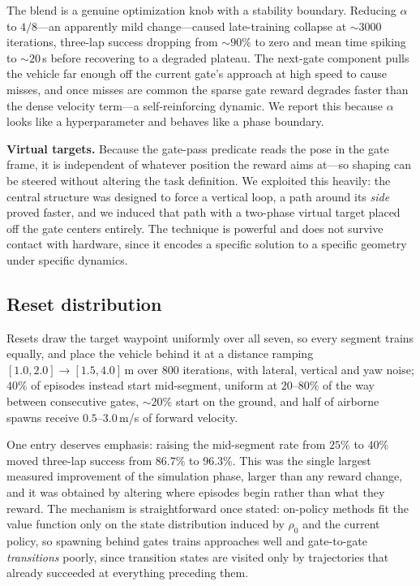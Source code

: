 \documentclass[10pt, twocolumn]{article}
\begin{document}
The blend is a genuine optimization knob with a stability boundary. Reducing
$\alpha$ to $4/8$---an apparently mild change---caused late-training collapse
at ${\sim}3000$ iterations, three-lap success dropping from ${\sim}90\%$ to
zero and mean time spiking to ${\sim}20$\,s before recovering to a degraded
plateau. The next-gate component pulls the vehicle far enough off the current
gate's approach at high speed to cause misses, and once misses are common the
sparse gate reward degrades faster than the dense velocity term---a
self-reinforcing dynamic. We report this because $\alpha$ looks like a
hyperparameter and behaves like a phase boundary.

\textbf{Virtual targets.} Because the gate-pass predicate reads the pose in the
gate frame, it is independent of whatever position the reward aims at---so
shaping can be steered without altering the task definition. We exploited this
heavily: the central structure was designed to force a vertical loop, a path
around its \emph{side} proved faster, and we induced that path with a
two-phase virtual target placed off the gate centers entirely. The technique is
powerful and does not survive contact with hardware, since it encodes a
specific solution to a specific geometry under specific dynamics.

\subsection{Reset distribution}

Resets draw the target waypoint uniformly over all seven, so every segment
trains equally, and place the vehicle behind it at a distance ramping
$[1.0,2.0] \rightarrow [1.5,4.0]$\,m over $800$ iterations, with lateral,
vertical and yaw noise; $40\%$ of episodes instead start mid-segment, uniform
at $20$--$80\%$ of the way between consecutive gates, ${\sim}20\%$ start on the
ground, and half of airborne spawns receive $0.5$--$3.0$\,m/s of forward
velocity.

One entry deserves emphasis: raising the mid-segment rate from $25\%$ to $40\%$
moved three-lap success from $86.7\%$ to $96.3\%$. This was the single largest
measured improvement of the simulation phase, larger than any reward change,
and it was obtained by altering where episodes begin rather than what they
reward. The mechanism is straightforward once stated: on-policy methods fit the
value function only on the state distribution induced by $\rho_0$ and the
current policy, so spawning behind gates trains approaches well and
gate-to-gate \emph{transitions} poorly, since transition states are visited
only by trajectories that already succeeded at everything preceding them.
\end{document}
